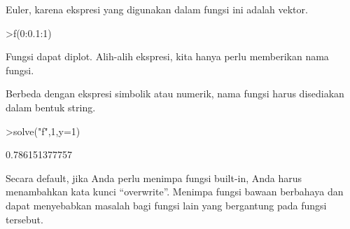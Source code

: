 \documentclass[a4paper,10pt]{article}
\begin{document}
\begin{eulernotebook}
\begin{eulercomment}
\begin{eulercomment}
\begin{eulercomment}
\begin{eulercomment}
\begin{eulercomment}
Euler, karena ekspresi yang digunakan dalam fungsi ini adalah vektor.
\end{eulercomment}
\begin{eulerprompt}
>f(0:0.1:1)
\end{eulerprompt}
\begin{euleroutput}
  [0,  0.100499,  0.203961,  0.313209,  0.430813,  0.559017,  0.699714,
  0.854459,  1.0245,  1.21083,  1.41421]
\end{euleroutput}
\begin{eulercomment}
Fungsi dapat diplot. Alih-alih ekspresi, kita hanya perlu memberikan
nama fungsi.


Berbeda dengan ekspresi simbolik atau numerik, nama fungsi harus
disediakan dalam bentuk string.
\end{eulercomment}
\begin{eulerprompt}
>solve("f",1,y=1)
\end{eulerprompt}
\begin{euleroutput}
  0.786151377757
\end{euleroutput}
\begin{eulercomment}
Secara default, jika Anda perlu menimpa fungsi built-in, Anda harus
menambahkan kata kunci “overwrite”. Menimpa fungsi bawaan berbahaya
dan dapat menyebabkan masalah bagi fungsi lain yang bergantung pada
fungsi tersebut.



\end{eulercomment}
\end{eulercomment}
\end{eulercomment}
\end{eulercomment}
\end{eulercomment}
\end{eulernotebook}
\end{document}
